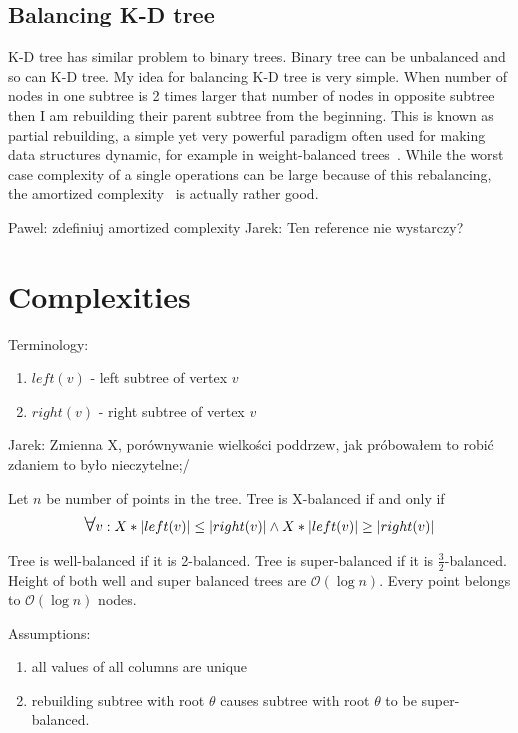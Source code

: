 \documentclass[10pt,a4paper]{article}
\newcommand{\pawel}[1]{\noindent\colorbox{myRed}{Pawel: #1}}
\newcommand{\jarek}[1]{\noindent\colorbox{myYellow}{Jarek: #1}}
\newcommand{\Oh}{\mathcal{O}}
\newcommand\bigforall{\mbox{\Large $\mathsurround0pt\forall$}}
\begin{document}
\subsection{Balancing K-D tree}
K-D tree has similar problem to binary trees. Binary tree can be unbalanced and so can K-D tree. My idea for balancing K-D tree is very simple. When number of nodes in one subtree is 2 times larger that number of nodes in opposite subtree then I am rebuilding their parent subtree from the beginning.
This is known as partial rebuilding, a simple yet very powerful paradigm often used for making data structures dynamic, for example in weight-balanced trees~\cite{ALPHATREES}. While the worst case complexity of a single operations can be large because of this rebalancing, the amortized complexity~\cite{AMOR} is actually rather good.

\pawel{zdefiniuj amortized complexity}
\jarek{Ten reference nie wystarczy?}


\section{Complexities}

Terminology:
\begin{enumerate}
\item $left(v)$ - left subtree of vertex $v$
\item $right(v)$ - right subtree of vertex $v$
\end{enumerate}

\jarek{Zmienna X, porównywanie wielkości poddrzew, jak próbowałem to robić zdaniem to było nieczytelne;/}

Let $n$ be number of points in the tree. Tree is X-balanced if and only if 
\begin{eqnarray*}
\bigforall v: X * |left(v)| \leq |right(v)| \wedge X * |left(v)| \geq |right(v)|
\end{eqnarray*}

Tree is well-balanced if it is 2-balanced. Tree is super-balanced if it is  $\frac{3}{2}$-balanced. Height of both well and super balanced trees are $\Oh(\log n)$. Every point belongs to $\Oh(\log n)$ nodes. 

Assumptions:
\begin{enumerate}
\item all values of all columns are unique
\item rebuilding subtree with root $\theta$ causes subtree with root $\theta$ to be super-balanced.
\end{enumerate}
\end{document}
